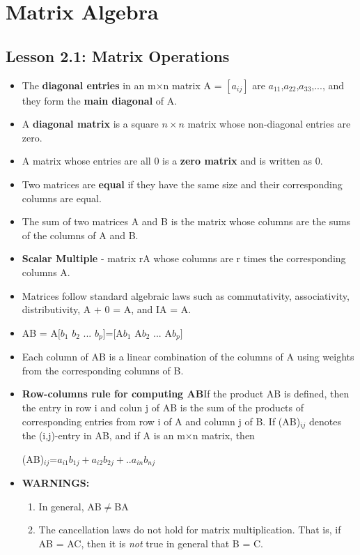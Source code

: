 \documentclass{report}
\newcommand{\mxn}{m$\times$n}
\begin{document}
\chapter{Matrix Algebra}
\section{Lesson 2.1: Matrix Operations}
	\begin{itemize}\addtolength{\leftskip}{2em}
		\item The \textbf{diagonal entries} in an {\mxn} matrix A = {$[a_{ij}]$} are {$a_{11}$},{$a_{22}$},{$a_{33}$},..., and they form the \textbf{main diagonal} of A.
		\item A \textbf{diagonal matrix} is a square {$n \times n$} matrix whose non-diagonal entries are zero. 
		\item A matrix whose entries are all 0 is a \textbf{zero matrix} and is written as 0. 
		\item Two matrices are \textbf{equal} if they have the same size and their corresponding columns are equal.
		\item The sum of two matrices A and B is the matrix whose columns are the sums of the columns of A and B.
		\item \textbf{Scalar Multiple} - matrix rA whose columns are r times the corresponding columns A.
		\item Matrices follow standard algebraic laws such as commutativity, associativity, distributivity, A + 0 = A, and IA = A.
		\item AB = A$[b_1$ $b_2$ ... $b_p$]=[A$b_1$ A$b_2$ ... A$b_p]$
		\item Each column of AB is a linear combination of the columns of A using weights from the corresponding columns of B.
		\item \textbf{Row-columns rule for computing AB}\newline If the product AB is defined, then the entry in row i and colun j of AB is the sum of the products of corresponding entries from row i of A and column j of B. If (AB){$_{ij}$} denotes the (i,j)-entry in AB, and if A is an {\mxn} matrix, then 
		\begin{center}
			(AB){$_{ij}$}={$a_{i1}b_{1j}+a_{i2}b_{2j}+..a_{in}b_{nj}$}
		\end{center}
		\item\textbf{WARNINGS:}
		\begin{enumerate}\addtolength{\leftskip}{2em}
		\item In general, AB$\ne$BA
		\item The cancellation laws do not hold for matrix multiplication. That is, if AB = AC, then it is \textit{not} true in general that B = C.

\end{enumerate}
\end{itemize}
\end{document}
